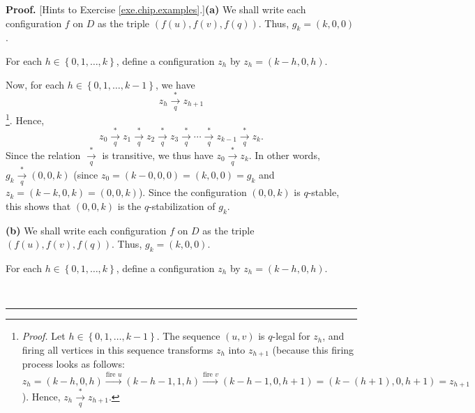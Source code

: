 \documentclass[numbers=enddot,12pt,final,onecolumn,notitlepage]{scrartcl}%
\theoremstyle{definition}
\newenvironment{proof}[1][Proof]{\noindent\textbf{#1.} }{\ \rule{0.5em}{0.5em}}
\begin{document}
\begin{proof}
[Hints to Exercise \ref{exe.chip.examples}.]\textbf{(a)} We shall write each
configuration $f$ on $D$ as the triple $\left(  f\left(  u\right)  ,f\left(
v\right)  ,f\left(  q\right)  \right)  $. Thus, $g_{k}=\left(  k,0,0\right)  $.

For each $h\in\left\{  0,1,\ldots,k\right\}  $, define a configuration $z_{h}$
by $z_{h}=\left(  k-h,0,h\right)  $.

Now, for each $h\in\left\{  0,1,\ldots,k-1\right\}  $, we have%
\[
z_{h}\underset{q}{\overset{\ast}{\rightarrow}}z_{h+1}%
\]
\footnote{\textit{Proof.} Let $h\in\left\{  0,1,\ldots,k-1\right\}  $. The
sequence $\left(  u,v\right)  $ is $q$-legal for $z_{h}$, and firing all
vertices in this sequence transforms $z_{h}$ into $z_{h+1}$ (because this
firing process looks as follows:%
\[
z_{h}=\left(  k-h,0,h\right)  \overset{\text{fire }u}{\longrightarrow}\left(
k-h-1,1,h\right)  \overset{\text{fire }v}{\longrightarrow}\left(
k-h-1,0,h+1\right)  =\left(  k-\left(  h+1\right)  ,0,h+1\right)  =z_{h+1}%
\]
). Hence, $z_{h}\underset{q}{\overset{\ast}{\rightarrow}}z_{h+1}$.}. Hence,%
\[
z_{0}\underset{q}{\overset{\ast}{\rightarrow}}z_{1}\underset{q}{\overset{\ast
}{\rightarrow}}z_{2}\underset{q}{\overset{\ast}{\rightarrow}}z_{3}%
\underset{q}{\overset{\ast}{\rightarrow}}\cdots\underset{q}{\overset{\ast
}{\rightarrow}}z_{k-1}\underset{q}{\overset{\ast}{\rightarrow}}z_{k}.
\]
Since the relation $\underset{q}{\overset{\ast}{\rightarrow}}$ is transitive,
we thus have $z_{0}\underset{q}{\overset{\ast}{\rightarrow}}z_{k}$. In other
words, $g_{k}\underset{q}{\overset{\ast}{\rightarrow}}\left(  0,0,k\right)  $
(since $z_{0}=\left(  k-0,0,0\right)  =\left(  k,0,0\right)  =g_{k}$ and
$z_{k}=\left(  k-k,0,k\right)  =\left(  0,0,k\right)  $). Since the
configuration $\left(  0,0,k\right)  $ is $q$-stable, this shows that $\left(
0,0,k\right)  $ is the $q$-stabilization of $g_{k}$.

\textbf{(b)} We shall write each configuration $f$ on $D$ as the triple
$\left(  f\left(  u\right)  ,f\left(  v\right)  ,f\left(  q\right)  \right)
$. Thus, $g_{k}=\left(  k,0,0\right)  $.

For each $h\in\left\{  0,1,\ldots,k\right\}  $, define a configuration $z_{h}$
by $z_{h}=\left(  k-h,0,h\right)  $.


\end{proof}
\end{document}
